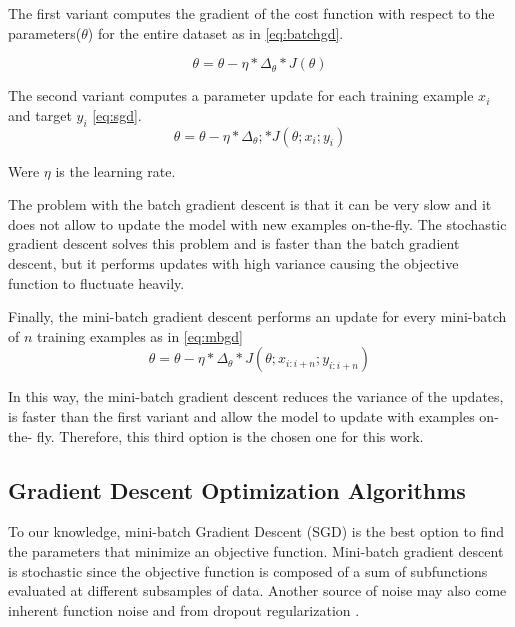 The first variant computes the gradient of the cost function with respect to the parameters($\theta$) for the entire dataset as in \ref{eq:batchgd}.

\begin{equation} \label{eq:batchgd}
\theta=\theta-\eta * \Delta_\theta * J(\theta)
\end{equation}

The second variant computes a parameter update for each training example $x_i$ and target $y_i$ \ref{eq:sgd}.
\begin{equation} \label{eq:sgd}
\theta=\theta-\eta * \Delta_\theta; * J(\theta;x_i;y_i)
\end{equation}

Were $\eta$ is the learning rate.

The problem with the batch gradient descent is that it can be very slow and it does not allow to update the model with new examples on-the-fly. The stochastic gradient descent solves this problem and is faster than the batch gradient descent, but it performs updates with high variance causing the objective function to fluctuate heavily.  

Finally, the mini-batch gradient descent performs an update for every mini-batch of $n$ training examples as in \ref{eq:mbgd} \begin{equation} \label{eq:mbgd}
\theta=\theta-\eta * \Delta_\theta * J(\theta;x_{i:i+n};y_{i:i+n})
\end{equation}

In this way, the mini-batch gradient descent reduces the variance of the updates, is faster than the first variant and allow the model to update with examples on-the- fly. Therefore, this third option is the chosen one for this work\cite{ruder2016overview}. 


\subsection{Gradient Descent Optimization Algorithms}
To our knowledge, mini-batch Gradient Descent (SGD) is the best option to find the parameters that minimize an objective function. Mini-batch gradient descent is stochastic since the objective function is composed of a sum of subfunctions evaluated at different subsamples of data. Another source of noise may also come inherent function noise and from dropout regularization \cite{kingma2014adam}. 

